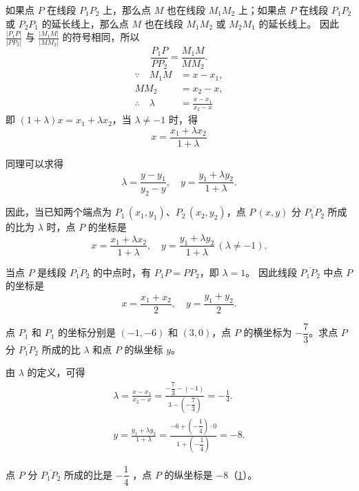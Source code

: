 如果点 $P$ 在线段 $P_1P_2$ 上，那么点 $M$ 也在线段 $M_1M_2$ 上；如果点 $P$ 在线段 $P_1P_2$ 或 $P_2P_1$ 的延长线上，那么点 $M$ 也在线段 $M_1M_2$ 或 $M_2M_1$ 的延长线上。
因此 $\frac{|P_1P|}{|PP_2|}$ 与 $\frac{|M_1M|}{|MM_2|}$ 的符号相同，所以
\[ \frac{P_1P}{PP_2}=\frac{M_1M}{MM_2}. \]
\begin{align*}
  \because \quad M_1M&=x-x_1, \\
  MM_2&=x_2-x, \\
  \therefore \quad \lambda&=\frac{x-x_1}{x_2-x} 
\end{align*}
即 $(1+\lambda)x=x_1+\lambda x_2$，当 $\lambda\neq -1$ 时，得
\[ x= \frac{x_1+\lambda x_2}{1+\lambda}\]

同理可以求得
\[ \lambda=\frac{y-y_1}{y_2-y}, \quad y=\frac{y_1+\lambda y_2}{1+\lambda}.\]

因此，当已知两个端点为 $P_1\,(x_1,y_1)$、$P_2\,(x_2,y_2)$，点 $P\,(x,y)$ 分 $\overline{P_1P_2}$ 所成的比为 $\lambda$ 时，点 $P$ 的坐标是
\[ x= \frac{x_1+\lambda x_2}{1+\lambda}, \quad y=\frac{y_1+\lambda y_2}{1+\lambda}\,(\lambda\neq-1).\]

当点 $P$ 是线段 $\overline{P_1P_2}$ 的中点时，有 $P_1P=PP_2$，即 $\lambda = 1$。
因此线段 $\overline{P_1P_2}$ 中点 $P$ 的坐标是
\[ x=\frac{x_1+x_2}{2},\quad y=\frac{y_1+y_2}{2}.\]

\begin{example}
点 $P_1$ 和 $P_1$ 的坐标分别是 $(-1,-6)$ 和 $(3,0)$，点 $P$ 的横坐标为 $-\dfrac{7}{3}$。求点 $P$ 分 $\overline{P_1P_2}$ 所成的比 $\lambda$ 和点 $P$ 的纵坐标 $y$。
\end{example}
\begin{solution}
  由 $\lambda$ 的定义，可得
  \begin{gather*} 
    \lambda=\frac{x-x_1}{x_2-x}=\frac{-\dfrac{7}{3}-(-1)}{3-\left(-\dfrac{7}{3}\right)}=-\frac{1}{4}.\\
    y=\frac{y_1+\lambda y_2}{1+\lambda}=\frac{-6+ \left( -\dfrac{1}{4}\right)\cdot 0}{1+\left( -\dfrac{1}{4}\right)}=-8.
  \end{gather*}

  点 $P$ 分 $\overline{P_1P_2}$ 所成的比是 $-\dfrac{1}{4}$ ，点 $P$ 的纵坐标是 $-8$（\cref{fig:1-12}）。
\end{solution}
\begin{figure}
  \caption{}\label{fig:1-12}
\end{figure}


